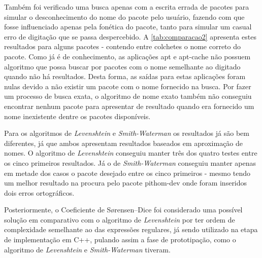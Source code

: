 Também foi verificado uma busca apenas com a escrita errada de pacotes para simular o desconhecimento do nome do pacote pelo usuário, fazendo com que fosse influenciado apenas pela fonética do pacote, tanto para simular um casual erro de digitação que se passa despercebido. A \autoref{tab:comparacao2} apresenta estes resultados para alguns pacotes - contendo entre colchetes o nome correto do pacote. Como já é de conhecimento, as aplicações {\code apt} e {\code apt-cache} não possuem algoritmo que possa buscar por pacotes com o nome semelhante ao digitado quando não há resultados. Desta forma, as saídas para estas aplicações foram nulas devido a não existir um pacote com o nome fornecido na busca. Por fazer um processo de busca exata, o algoritmo de nome exato também não conseguiu encontrar nenhum pacote para apresentar de resultado quando era fornecido um nome inexistente dentre os pacotes disponíveis. 

Para os algoritmos de \textit{Levenshtein} e \textit{Smith-Waterman} os resultados já são bem diferentes, já  que ambos apresentam resultados baseados em aproximação de nomes. O algoritmo de \textit{Levenshtein} conseguiu manter três dos quatro testes entre os cinco primeiros resultados. Já o de \textit{Smith-Waterman} conseguiu manter apenas em metade dos casos o pacote desejado entre os cinco primeiros - mesmo tendo um melhor resultado na procura pelo pacote {\code pithom-dev} onde foram inseridos dois erros ortográficos.


Posteriormente, o Coeficiente de Sørensen–Dice foi considerado uma possível solução em comparativo com o algoritmo de \textit{Levenshtein} por ter ordem de complexidade semelhante ao das expressões regulares, já sendo utilizado na etapa de implementação em C++, pulando assim a fase de prototipação, como o algoritmo de \textit{Levenshtein} e \textit{Smith-Waterman} tiveram.
